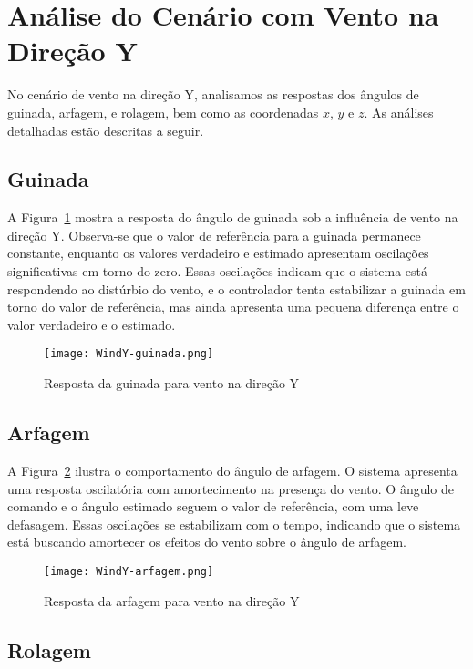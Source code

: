 \section{Análise do Cenário com Vento na Direção Y}

No cenário de vento na direção Y, analisamos as respostas dos ângulos de guinada, arfagem, e rolagem, bem como as coordenadas \(x\), \(y\) e \(z\). As análises detalhadas estão descritas a seguir.

\subsection{Guinada}

A Figura~\ref{fig:WindY-guinada} mostra a resposta do ângulo de guinada sob a influência de vento na direção Y. Observa-se que o valor de referência para a guinada permanece constante, enquanto os valores verdadeiro e estimado apresentam oscilações significativas em torno do zero. Essas oscilações indicam que o sistema está respondendo ao distúrbio do vento, e o controlador tenta estabilizar a guinada em torno do valor de referência, mas ainda apresenta uma pequena diferença entre o valor verdadeiro e o estimado.

\begin{figure}[H]
    \centering
    \texttt{[image: WindY-guinada.png]}
    \caption{Resposta da guinada para vento na direção Y}
    \label{fig:WindY-guinada}
\end{figure}

\subsection{Arfagem}

A Figura~\ref{fig:WindY-arfagem} ilustra o comportamento do ângulo de arfagem. O sistema apresenta uma resposta oscilatória com amortecimento na presença do vento. O ângulo de comando e o ângulo estimado seguem o valor de referência, com uma leve defasagem. Essas oscilações se estabilizam com o tempo, indicando que o sistema está buscando amortecer os efeitos do vento sobre o ângulo de arfagem.

\begin{figure}[H]
    \centering
    \texttt{[image: WindY-arfagem.png]}
    \caption{Resposta da arfagem para vento na direção Y}
    \label{fig:WindY-arfagem}
\end{figure}

\subsection{Rolagem}

